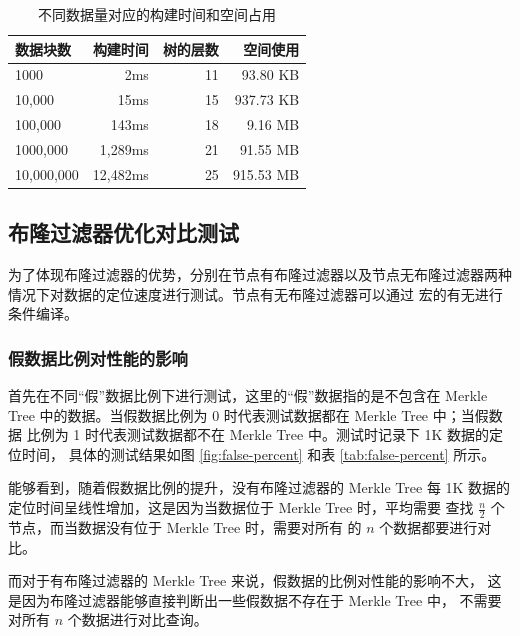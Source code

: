 \documentclass{mydoc}
\begin{document}
\begin{table}[htbp]
  \centering
  \caption{不同数据量对应的构建时间和空间占用}%
  \label{tab:build-time}

  \vspace{10pt}
  \begin{tabular}{lrrr}
    \toprule
    \textbf{数据块数} & \textbf{构建时间} & \textbf{树的层数} & \textbf{空间使用} \\
    \midrule
    1000              & 2ms               & 11                & 93.80 KB  \\
    10,000            & 15ms              & 15                & 937.73 KB \\
    100,000           & 143ms             & 18                & 9.16 MB   \\
    1000,000          & 1,289ms           & 21                & 91.55 MB  \\
    10,000,000        & 12,482ms          & 25                & 915.53 MB \\
    \bottomrule
  \end{tabular}
\end{table}

\subsection{布隆过滤器优化对比测试}

为了体现布隆过滤器的优势，分别在节点有布隆过滤器以及节点无布隆过滤器两种
情况下对数据的定位速度进行测试。节点有无布隆过滤器可以通过 
宏的有无进行条件编译。

\subsubsection{假数据比例对性能的影响}

首先在不同``假''数据比例下进行测试，这里的``假''数据指的是不包含在 Merkle
Tree 中的数据。当假数据比例为 0 时代表测试数据都在 Merkle Tree 中；当假数据
比例为 1 时代表测试数据都不在 Merkle Tree 中。测试时记录下 1K 数据的定位时间，
具体的测试结果如图 \ref{fig:false-percent} 和表 \ref{tab:false-percent} 所示。

能够看到，随着假数据比例的提升，没有布隆过滤器的 Merkle Tree 每 1K
数据的定位时间呈线性增加，这是因为当数据位于 Merkle Tree 时，平均需要
查找 $\frac{n}{2}$ 个节点，而当数据没有位于 Merkle Tree 时，需要对所有
的 $n$ 个数据都要进行对比。

而对于有布隆过滤器的 Merkle Tree 来说，假数据的比例对性能的影响不大，
这是因为布隆过滤器能够直接判断出一些假数据不存在于 Merkle Tree 中，
不需要对所有 $n$ 个数据进行对比查询。
\end{document}
